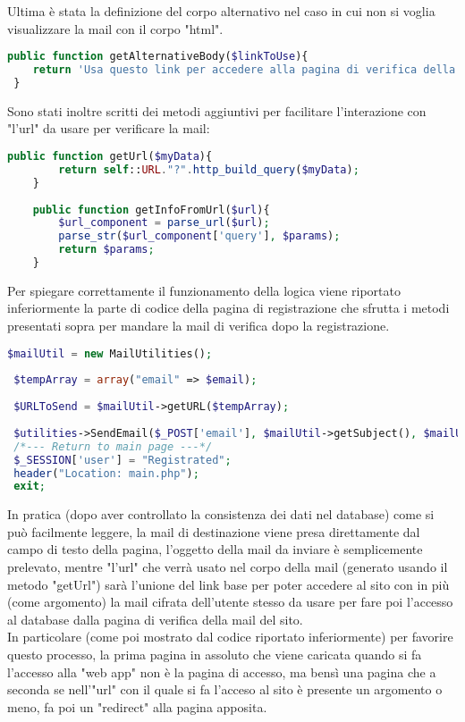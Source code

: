  Ultima è stata la definizione del corpo alternativo nel caso in cui non si voglia visualizzare la mail con il corpo "html".\\
 
  \begin{lstlisting}[language=php]
 public function getAlternativeBody($linkToUse){
 	return 'Usa questo link per accedere alla pagina di verifica della mail: '.$linkToUse;
 }
  \end{lstlisting}
  
  Sono stati inoltre scritti dei metodi aggiuntivi per facilitare l'interazione con "l'url" da usare per verificare la mail:\\
  
 \begin{lstlisting}[language=php]
   	public function getUrl($myData){
   		return self::URL."?".http_build_query($myData);
   	}
   	
   	public function getInfoFromUrl($url){
   		$url_component = parse_url($url);
   		parse_str($url_component['query'], $params);
   		return $params;
   	}
 \end{lstlisting}
 
 Per spiegare correttamente il funzionamento della logica viene riportato inferiormente la parte di codice della pagina di registrazione che sfrutta i metodi presentati sopra per mandare la mail di verifica dopo la registrazione. 
 
 \begin{lstlisting}[language=php]
 $mailUtil = new MailUtilities();
 
 $tempArray = array("email" => $email);
 
 $URLToSend = $mailUtil->getURL($tempArray);
 
 $utilities->SendEmail($_POST['email'], $mailUtil->getSubject(), $mailUtil->getBody($URLToSend), $mailUtil->getAlternativeBody($URLToSend));
 /*--- Return to main page ---*/
 $_SESSION['user'] = "Registrated";
 header("Location: main.php");
 exit;
  \end{lstlisting}
  
  In pratica (dopo aver controllato la consistenza dei dati nel database) come si può facilmente leggere, la mail di destinazione viene presa direttamente dal campo di testo della pagina, l'oggetto della mail da inviare è semplicemente prelevato, mentre "l'url" che verrà usato nel corpo della mail (generato usando il metodo "getUrl") sarà l'unione del link base per poter accedere al sito con in più (come argomento) la mail cifrata dell'utente stesso da usare per fare poi l'accesso al database dalla pagina di verifica della mail del sito.\\
  In particolare (come poi mostrato dal codice riportato inferiormente) per favorire questo processo, la prima pagina in assoluto che viene caricata quando si fa l'accesso alla "web app" non è la pagina di accesso, ma bensì una pagina che a seconda se nell'"url" con il quale si fa l'acceso al sito è presente un argomento o meno, fa poi un "redirect" alla pagina apposita.\\
  
